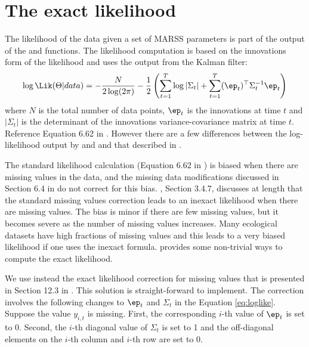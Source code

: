 \section{The exact likelihood}
\label{sec:exactlikelihood}
The likelihood of the data given a set of MARSS parameters is part of the output of the \verb@MARSSkfss@{} and \verb@MARSSkfas@{}
 functions.  The likelihood computation is based on the innovations form of the likelihood \citep{Schweppe1965} and uses the output from the Kalman filter:
\begin{equation}
\log \Lik(\Theta | data) = -\frac{N}{2\log(2\pi)} - \frac{1}{2}\left( \sum_{t=1}^T\log |\Sigma_t| + \sum_{t=1}^T (\ep_t)^\top \Sigma_t^{-1} \ep_t \right)
\label{eq:loglike}
\end{equation}
where $N$ is the total number of data points, $\ep_t$ is the innovations at time $t$ and $|\Sigma_t|$ is the determinant of the innovations variance-covariance matrix at time $t$.  Reference Equation 6.62 in \citet{ShumwayStoffer2006}. However there are a few differences between the log-likelihood output by \verb@MARSSkf@{} and \verb@MARSSkfas@{} and that described in \citet{ShumwayStoffer2006}.

The standard likelihood calculation (Equation 6.62 in \citet{ShumwayStoffer2006}) is biased when there are missing values in the data, and the missing data modifications discussed in Section 6.4 in \citet{ShumwayStoffer2006} do not correct for this bias. \citet{Harvey1989}, Section 3.4.7, discusses at length that the standard missing values correction leads to an inexact likelihood when there are missing values. The bias is minor if there are few missing values, but it becomes severe as the number of missing values increases.  Many ecological datasets have high fractions of missing values and this  leads to a very biased likelihood if one uses the inexact formula.  \citet{Harvey1989} provides some non-trivial ways to compute the exact likelihood.  

We use instead the exact likelihood correction for missing values that is presented in Section 12.3 in \citet{BrockwellDavis1991}.  This solution is straight-forward to implement.  The correction involves the following changes to $\ep_t$ and $\Sigma_t$ in the Equation \ref{eq:loglike}.  Suppose the value $y_{i,t}$ is missing.  First, the corresponding $i$-th value of $\ep_t$ is set to 0.  Second, the $i$-th diagonal value of $\Sigma_t$ is set to 1 and the off-diagonal elements on the $i$-th column and $i$-th row are set to 0.

